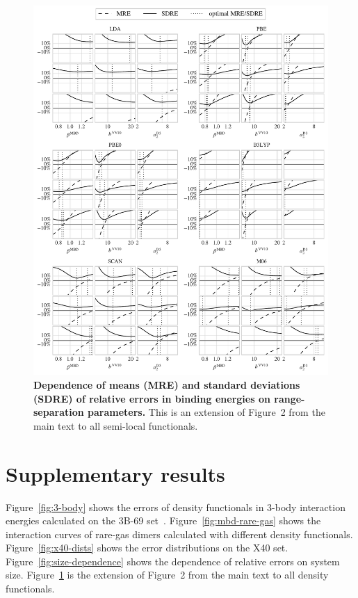 \documentclass[twocolumn]{article}
\renewcommand\cite{\citep}
\begin{document}
\begin{figure}
\includegraphics[center]{../media/param-fitting-all}
\caption{\textbf{Dependence of means (MRE) and standard deviations (SDRE) of relative errors in binding energies on range-separation parameters.}
This is an extension of Figure~2 from the main text to all semi-local functionals.
}\label{fig:param-fitting-all}
\end{figure}

\section{Supplementary results}

Figure~\ref{fig:3-body} shows the errors of density functionals in 3-body interaction energies calculated on the 3B-69 set~\cite{RezacJCTC15}.
Figure~\ref{fig:mbd-rare-gas} shows the interaction curves of rare-gas dimers calculated with different density functionals.
Figure~\ref{fig:x40-dists} shows the error distributions on the X40 set.
Figure~\ref{fig:size-dependence} shows the dependence of relative errors on system size.
Figure~\ref{fig:param-fitting-all} is the extension of Figure~2 from the main text to all density functionals.

\begingroup
\renewcommand{\section}[2]{}
\setlength\bibsep{0pt}
\footnotesize

\endgroup
\end{document}
